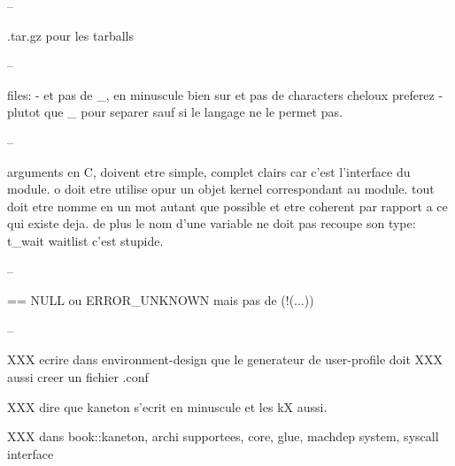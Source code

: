 --

.tar.gz pour les tarballs

--

files: - et pas de _, en minuscule bien sur et pas de characters cheloux
preferez - plutot que _ pour separer sauf si le langage ne le permet pas.

--

arguments en C, doivent etre simple, complet clairs car c'est l'interface
du module. o doit etre utilise opur un objet kernel correspondant au module.
tout doit etre nomme en un mot autant que possible et etre coherent par
rapport a ce qui existe deja. de plus le nom d'une variable ne doit
pas recoupe son type: t_wait waitlist c'est stupide.

--

== NULL ou ERROR_UNKNOWN mais pas de (!(...))

--

XXX ecrire dans environment-design que le generateur de user-profile doit
XXX aussi creer un fichier .conf

XXX dire que kaneton s'ecrit en minuscule et les kX aussi.

XXX dans book::kaneton, archi supportees, core, glue, machdep system, syscall
    interface

